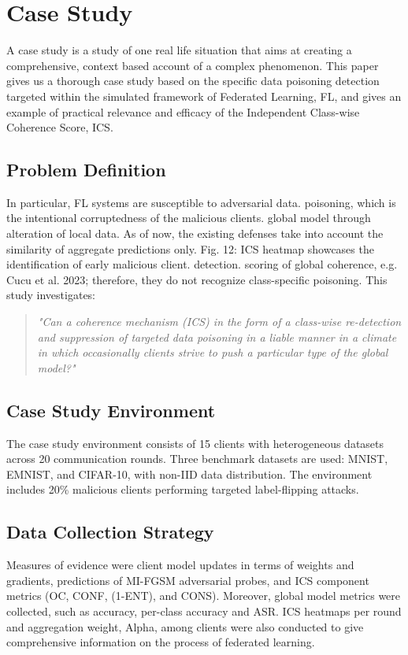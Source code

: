 \documentclass[conference]{IEEEtran}
\begin{document}
\section{Case Study}
\label{sec:case_study}
A case study is a study of one real life situation that aims at creating a comprehensive, context based account of a complex phenomenon. This paper gives us a thorough case study based on the specific data poisoning detection targeted within the simulated framework of Federated Learning, FL, and gives an example of practical relevance and efficacy of the Independent Class-wise Coherence Score, ICS.
\subsection{Problem Definition}
In particular, FL systems are susceptible to adversarial data.
poisoning, which is the intentional corruptedness of the malicious clients.
global model through alteration of local data. As of now, the existing
defenses take into account the similarity of aggregate predictions only.
Fig. 12: ICS heatmap showcases the identification of early malicious client.
detection.
scoring of global coherence, e.g. Cucu et al. 2023; therefore,
they do not recognize class-specific poisoning.
This study investigates:
\begin{quote}
\emph{"Can a coherence mechanism (ICS) in the form of a class-wise re-detection and suppression of targeted data poisoning in a liable manner in a climate in which occasionally clients strive to
push a particular type of the global model?"}
\end{quote}

\subsection{Case Study Environment}
The case study environment consists of 15 clients with heterogeneous datasets across 20 communication rounds. Three benchmark datasets are used: MNIST, EMNIST, and CIFAR-10, with non-IID data distribution. The environment includes 20\% malicious clients performing targeted label-flipping attacks.

\subsection{Data Collection Strategy}
Measures of evidence were client model updates in terms of weights and gradients, predictions of MI-FGSM adversarial probes, and ICS component metrics (OC, CONF, (1-ENT), and CONS). Moreover, global model metrics were collected, such as accuracy, per-class accuracy and ASR. ICS heatmaps per round and aggregation weight, Alpha, among clients were also conducted to give comprehensive information on the process of federated learning.
\end{document}
